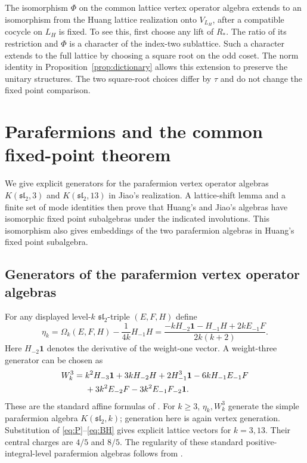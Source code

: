 \documentclass[11pt,reqno]{amsart}
\theoremstyle{definition}\newtheorem{definition}[theorem]{Definition}
\theoremstyle{remark}\newtheorem{remark}[theorem]{Remark}
\newcommand{\one}{\mathbf1}\newcommand{\slc}{\mathfrak{sl}_2}
\numberwithin{equation}{section}
\begin{document}
The isomorphism $\Phi$ on the common lattice vertex operator algebra extends to an isomorphism from the Huang lattice realization onto $V_{L_H}$, after a compatible cocycle on $L_H$ is fixed. To see this, first choose any lift of $R_*$. The ratio of its restriction and $\Phi$ is a character of the index-two sublattice. Such a character extends to the full lattice by choosing a square root on the odd coset. The norm identity in Proposition~\ref{prop:dictionary} allows this extension to preserve the unitary structures. The two square-root choices differ by $\tau$ and do not change the fixed point comparison.


\section{Parafermions and the common fixed-point theorem}\label{sec:fixed}
We give explicit generators for the parafermion vertex operator algebras $K(\slc,3)$ and $K(\slc,13)$ in Jiao's realization. A lattice-shift lemma and a finite set of mode identities then prove that Huang's and Jiao's algebras have isomorphic fixed point subalgebras under the indicated involutions. This isomorphism also gives embeddings of the two parafermion algebras in Huang's fixed point subalgebra.

\subsection{Generators of the parafermion vertex operator algebras}
For any displayed level-$k$ $\slc$-triple $(E,F,H)$ define
\begin{equation}\label{eq:eta}
 \eta_k=\Omega_k(E,F,H)-\frac1{4k}H_{-1}H
 =\frac{-kH_{-2}\one-H_{-1}H+2kE_{-1}F}{2k(k+2)}.
\end{equation}
Here $H_{-2}\one$ denotes the derivative of the weight-one vector. A weight-three generator can be chosen as
\begin{align}\label{eq:W3}
 W_k^3={}&k^2H_{-3}\one+3kH_{-2}H+2H_{-1}^3\one
          -6kH_{-1}E_{-1}F\notag\\
 &+3k^2E_{-2}F-3k^2E_{-1}F_{-2}\one.
\end{align}
These are the standard affine formulas of \cite{DLLWY}. For $k\ge3$, $\eta_k,W_k^3$ generate the simple parafermion algebra $K(\slc,k)$; generation here is again vertex generation. Substitution of \eqref{eq:P}--\eqref{eq:BH} gives explicit lattice vectors for $k=3,13$. Their central charges are $4/5$ and $8/5$. The regularity of these standard positive-integral-level parafermion algebras follows from \cite{ALY}.
\end{document}
